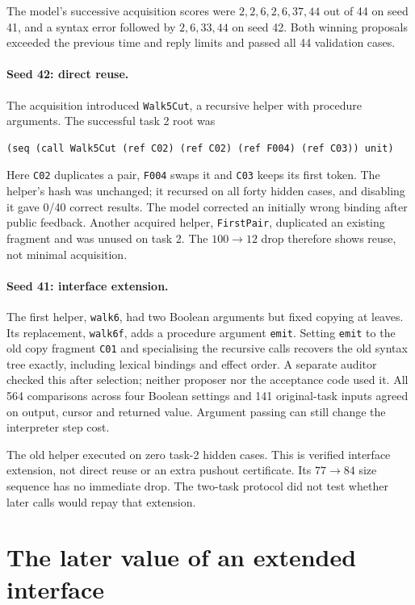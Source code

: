 The model's successive acquisition scores were $2,2,6,2,6,37,44$ out of 44 on
seed 41, and a syntax error followed by $2,6,33,44$ on seed 42. Both winning
proposals exceeded the previous time and reply limits and passed all 44
validation cases.

\begin{samepage}
\paragraph{Seed 42: direct reuse.}
The acquisition introduced \texttt{Walk5Cut}, a recursive helper with procedure
arguments. The successful task 2 root was
\begin{verbatim}
(seq (call Walk5Cut (ref C02) (ref C02) (ref F004) (ref C03)) unit)
\end{verbatim}
\end{samepage}
Here \texttt{C02} duplicates a pair, \texttt{F004} swaps it and \texttt{C03}
keeps its first token. The helper's hash was unchanged; it recursed on all
forty hidden cases, and disabling it gave 0/40 correct results. The model
corrected an initially wrong binding after public feedback. Another acquired
helper, \texttt{FirstPair}, duplicated an existing fragment and was unused on
task 2. The $100\to12$ drop therefore shows reuse, not minimal acquisition.

\paragraph{Seed 41: interface extension.}
The first helper, \texttt{walk6}, had two Boolean arguments but fixed copying
at leaves. Its replacement, \texttt{walk6f}, adds a procedure argument
\texttt{emit}. Setting \texttt{emit} to the old copy fragment \texttt{C01}
and specialising the recursive calls recovers the old syntax tree exactly,
including lexical bindings and effect order. A separate auditor checked this
after selection; neither proposer nor the acceptance code used it. All 564
comparisons across four Boolean settings and 141 original-task inputs agreed
on output, cursor and returned value. Argument passing can still change the
interpreter step cost.

The old helper executed on zero task-2 hidden cases. This is verified interface
extension, not direct reuse or an extra pushout certificate. Its $77\to84$
size sequence has no immediate drop. The two-task protocol did not test whether
later calls would repay that extension.

\section{The later value of an extended interface}
\label{sec:transfer-value}

